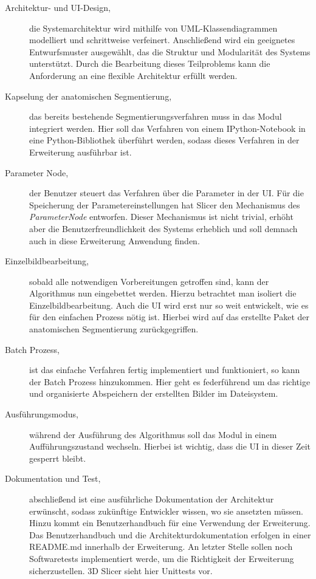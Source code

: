 \begin{description}
	\item[Architektur- und \ac{UI}-Design,] die Systemarchitektur wird mithilfe von
		\ac{UML}-Klassendiagrammen modelliert und schrittweise verfeinert. Anschließend
		wird ein geeignetes Entwurfsmuster ausgewählt, das die Struktur und
		Modularität des Systems unterstützt. Durch die Bearbeitung dieses Teilproblems
		kann die Anforderung an eine flexible Architektur erfüllt werden.

	\item[Kapselung der anatomischen Segmentierung,] das bereits bestehende Segmentierungsverfahren
		muss in das Modul integriert werden. Hier soll das Verfahren von einem
		IPython-Notebook in eine Python-Bibliothek überführt werden, sodass dieses Verfahren
		in der Erweiterung ausführbar ist.

	\item[Parameter Node,] der Benutzer steuert das Verfahren über die Parameter in
		der \ac{UI}. Für die Speicherung der Parametereinstellungen hat Slicer den Mechanismus
		des \textit{ParameterNode} entworfen. Dieser Mechanismus ist nicht trivial,
		erhöht aber die Benutzerfreundlichkeit des Systems erheblich und soll
		demnach auch in diese Erweiterung Anwendung finden.

	\item[Einzelbildbearbeitung,] sobald alle notwendigen Vorbereitungen getroffen
		sind, kann der Algorithmus nun eingebettet werden. Hierzu betrachtet man isoliert
		die Einzelbildbearbeitung. Auch die \ac{UI} wird erst nur so weit entwickelt,
		wie es für den einfachen Prozess nötig ist. Hierbei wird auf das erstellte Paket
		der anatomischen Segmentierung zurückgegriffen.

	\item[Batch Prozess,] ist das einfache Verfahren fertig implementiert und funktioniert,
		so kann der Batch Prozess hinzukommen. Hier geht es federführend um das richtige
		und organisierte Abspeichern der erstellten Bilder im Dateisystem.

	\item[Ausführungsmodus,] während der Ausführung des Algorithmus soll das Modul
		in einem Aufführungszustand wechseln. Hierbei ist wichtig, dass die \ac{UI}
		in dieser Zeit gesperrt bleibt.

	\item[Dokumentation und Test,] abschließend ist eine ausführliche Dokumentation
		der Architektur erwünscht, sodass zukünftige Entwickler wissen, wo sie ansetzten
		müssen. Hinzu kommt ein Benutzerhandbuch für eine Verwendung der Erweiterung.
		Das Benutzerhandbuch und die Architekturdokumentation erfolgen in einer README.md
		innerhalb der Erweiterung. An letzter Stelle sollen noch Softwaretests
		implementiert werde, um die Richtigkeit der Erweiterung sicherzustellen. 3D
		Slicer sieht hier Unittests vor.
\end{description}

